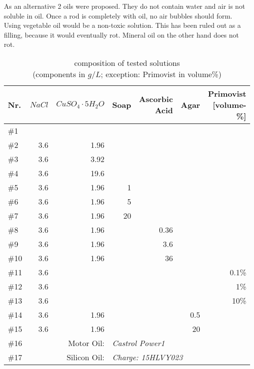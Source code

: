 As an alternative 2 oils were proposed. They do not contain water and air is not soluble in oil. Once a rod is completely with oil, no air bubbles should form.
Using vegetable oil would be a non-toxic solution. This has been ruled out as a filling, because it would eventually rot.
Mineral oil on the other hand does not rot.


\begin{table}[!hbt]
\centering
\begin{tabular}{@{}l|rrrrrr@{}}
Nr.   & $NaCl$   & $CuSO_4\cdot5H_2O$          & Soap & Ascorbic Acid & Agar & Primovist [volume-\%]\\
\toprule
\#1  &             &                   &      &               &           &		\\
\#2  & 3.6         & 1.96              &      &               &           &		\\
\#3  & 3.6         & 3.92              &      &               &           &		\\
\#4  & 3.6         & 19.6              &      &               &           &		\\
\#5  & 3.6         & 1.96              & 1    &               &           &		\\
\#6  & 3.6         & 1.96              & 5    &               &           &		\\
\#7  & 3.6         & 1.96              & 20   &               &           &		\\
\#8  & 3.6         & 1.96              &      & 0.36          &           &		\\
\#9  & 3.6         & 1.96              &      & 3.6           &           &		\\
\#10 & 3.6         & 1.96              &      & 36            &           &		\\
\#11 & 3.6         &                   &      &               &           & 0.1\%	\\
\#12 & 3.6         &                   &      &               &           & 1\%		\\
\#13 & 3.6         &                   &      &               &           & 10\%	\\
\#14 & 3.6         & 1.96              &      &               &  0.5      &		\\
\#15 & 3.6         & 1.96              &      &               &   20      &		\\
\midrule
\#16 & \multicolumn{2}{r}{Motor Oil:}   & \multicolumn{4}{l}{\textit{Castrol Power1}}      \\
\#17 & \multicolumn{2}{r}{Silicon Oil:} & \multicolumn{4}{l}{\textit{Charge: 15HLVY023}}   \\ \bottomrule
\end{tabular}
\caption{composition of tested solutions\\(components in $g/L$; exception: Primovist in volume\%)}
\label{tab:solutions}
\end{table}


